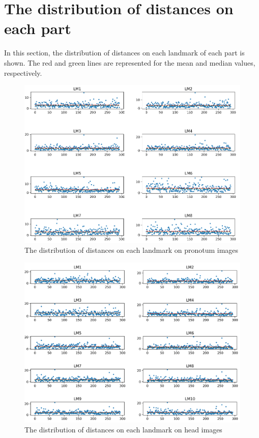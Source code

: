 \documentclass[review]{elsarticle}
\begin{document}
\section{The distribution of distances on each part}
\label{appdixB}
In this section, the distribution of distances on each landmark of each part is shown. The red and green lines are represented for the mean and median values, respectively.
\begin{figure}[htbp]
    \centering
    \includegraphics[width=.95\textwidth]{images/charts/pronotum_2.png}
    \caption{The distribution of distances on each landmark on pronotum images}
\end{figure}

\begin{figure}[htbp]
    \centering
    \includegraphics[width=.95\textwidth]{images/charts/tete_2.png}
    \caption{The distribution of distances on each landmark on head images}
\end{figure}
\end{document}

